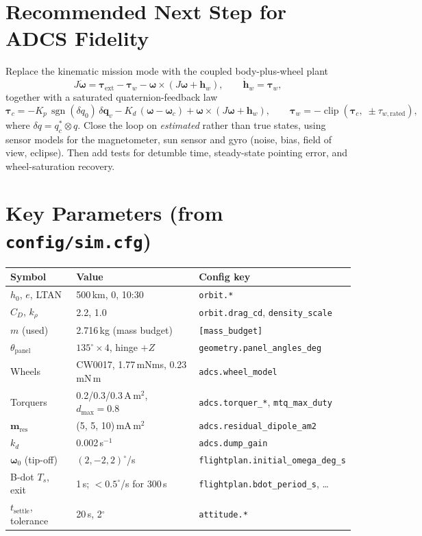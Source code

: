 \documentclass[11pt,a4paper]{article}
\newcommand{\vb}[1]{\boldsymbol{#1}}
\newcommand{\code}[1]{\texttt{#1}}
\begin{document}
\section{Recommended Next Step for ADCS Fidelity}\label{sec:recommend}
Replace the kinematic mission mode with the coupled body-plus-wheel plant
\begin{equation}
J\dot{\vb\omega} = \vb\tau_{\text{ext}} - \vb\tau_w - \vb\omega\times(J\vb\omega + \vb h_w),\qquad \dot{\vb h}_w = \vb\tau_w,
\label{eq:plant}
\end{equation}
together with a saturated quaternion-feedback law
\begin{equation}
\vb\tau_c = -K_p\,\operatorname{sgn}(\delta q_0)\,\delta\vb q_v - K_d\,(\vb\omega - \vb\omega_c) + \vb\omega\times(J\vb\omega + \vb h_w),\qquad
\vb\tau_w = -\operatorname{clip}(\vb\tau_c,\; \pm\tau_{w,\text{rated}}),
\end{equation}
where $\delta q = q_c^{*}\otimes q$. Close the loop on \emph{estimated} rather than true states, using sensor models for the magnetometer, sun sensor and gyro (noise, bias, field of view, eclipse). Then add tests for detumble time, steady-state pointing error, and wheel-saturation recovery.

\appendix
\section{Key Parameters (from \texttt{config/sim.cfg})}
\begin{center}
\begin{tabular}{@{}lll@{}}
\toprule
Symbol & Value & Config key\\
\midrule
$h_0$, $e$, LTAN & 500\,km, 0, 10:30 & \code{orbit.*}\\
$C_D$, $k_\rho$ & 2.2, 1.0 & \code{orbit.drag\_cd}, \code{density\_scale}\\
$m$ (used) & 2.716\,kg (mass budget) & \code{[mass\_budget]}\\
$\theta_{\text{panel}}$ & $135^\circ\times4$, hinge $+Z$ & \code{geometry.panel\_angles\_deg}\\
Wheels & CW0017, 1.77\,mNms, 0.23\,mN\,m & \code{adcs.wheel\_model}\\
Torquers & 0.2/0.3/0.3\,A\,m$^2$, $d_{\max} = 0.8$ & \code{adcs.torquer\_*}, \code{mtq\_max\_duty}\\
$\vb m_{\text{res}}$ & (5, 5, 10)\,mA\,m$^2$ & \code{adcs.residual\_dipole\_am2}\\
$k_d$ & 0.002\,s$^{-1}$ & \code{adcs.dump\_gain}\\
$\vb\omega_0$ (tip-off) & $(2, -2, 2)^\circ$/s & \code{flightplan.initial\_omega\_deg\_s}\\
B-dot $T_s$, exit & 1\,s; $<0.5^\circ$/s for 300\,s & \code{flightplan.bdot\_period\_s}, \dots\\
$t_{\text{settle}}$, tolerance & 20\,s, 2$^\circ$ & \code{attitude.*}\\
\bottomrule
\end{tabular}
\end{center}
\end{document}
